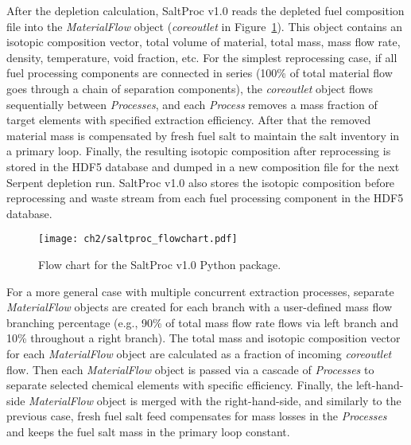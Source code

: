 After the depletion calculation, SaltProc v1.0 reads the depleted fuel 
composition file into the \textit{MaterialFlow} object 
(\textit{core\textunderscore outlet} in Figure~\ref{fig:saltproc_flow}). This 
object contains an isotopic composition vector, total volume of material, 
total mass, mass flow rate, density, temperature, void fraction, etc. For the 
simplest reprocessing case, if all fuel processing components are connected in 
series (100\% of total material flow goes through a chain of separation 
components), the \textit{core\textunderscore outlet} object flows sequentially 
between \textit{Processes}, and each \textit{Process} removes a mass fraction 
of target elements with specified extraction efficiency. 
After that the removed material mass is compensated by fresh fuel salt to 
maintain the salt inventory in a primary loop. Finally, the resulting isotopic 
composition after reprocessing is stored in the HDF5 database and dumped in a 
new composition file for the next Serpent depletion run. SaltProc v1.0 also 
stores the isotopic composition before reprocessing and waste stream from each 
fuel processing component in the HDF5 database. 
\begin{figure}[ht!] %
	\centering
	\texttt{[image: ch2/saltproc\_flowchart.pdf]}
	\caption{Flow chart for the SaltProc v1.0 Python package.}
	\label{fig:saltproc_flow}
\end{figure}

For a more general case with multiple concurrent extraction processes,  
separate \textit{MaterialFlow} objects are created for each branch with a 
user-defined mass flow branching percentage (e.g., 90\% of total mass flow 
rate flows via left branch and 10\% throughout a right branch). The total mass 
and isotopic composition vector for each \textit{MaterialFlow} object are 
calculated as a fraction of incoming \textit{core\textunderscore outlet} flow. 
Then each \textit{MaterialFlow} object is passed via a cascade of 
\textit{Processes} to separate selected chemical elements with specific 
efficiency. Finally, the left-hand-side \textit{MaterialFlow} object is merged 
with the right-hand-side, and similarly to the previous case, fresh fuel salt 
feed compensates for mass losses in the \textit{Processes} and keeps the fuel 
salt mass in the primary loop constant.

